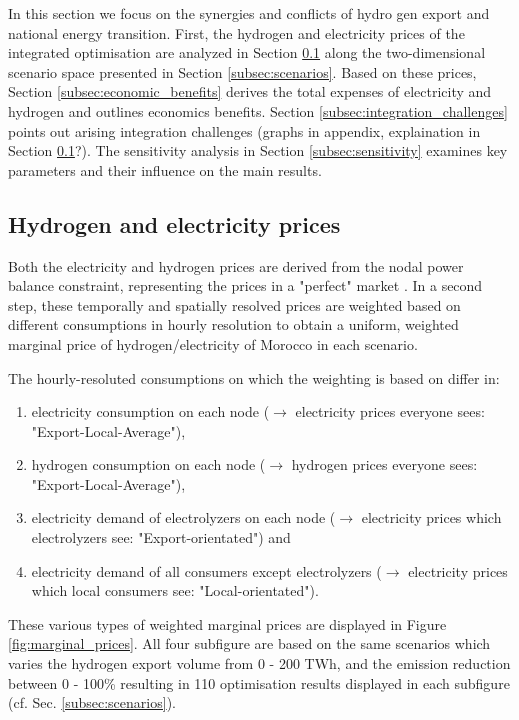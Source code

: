 In this section we focus on the synergies and conflicts of hydro gen export and national energy transition. First, the
hydrogen and electricity prices of the integrated optimisation are analyzed in Section \ref{subsec:results_prices} along the two-dimensional scenario space presented in Section \ref{subsec:scenarios}. Based on these prices, Section \ref{subsec:economic_benefits} derives the total expenses of electricity and hydrogen and outlines economics benefits. Section \ref{subsec:integration_challenges} points out arising integration challenges (graphs in appendix, explaination in Section \ref{subsec:results_prices}?). The sensitivity analysis in Section \ref{subsec:sensitivity} examines key parameters and their influence on the main results.


\subsection{Hydrogen and electricity prices}
\label{subsec:results_prices}

Both the electricity and hydrogen prices are derived from the nodal power balance constraint, representing the prices in a "perfect" market \cite{Zeyen2022}.
In a second step, these temporally and spatially resolved prices are weighted based on different consumptions in hourly resolution to obtain a uniform, weighted marginal price of hydrogen/electricity of Morocco in each scenario.

The hourly-resoluted consumptions on which the weighting is based on differ in:
\begin{enumerate}
    \item electricity consumption on each node ($\rightarrow$ electricity prices everyone sees: "Export-Local-Average"),
    \item hydrogen consumption on each node ($\rightarrow$ hydrogen prices everyone sees: "Export-Local-Average"),
    \item electricity demand of electrolyzers on each node ($\rightarrow$ electricity prices which electrolyzers see: "Export-orientated") and
    \item electricity demand of all consumers except electrolyzers ($\rightarrow$ electricity prices which local consumers see: "Local-orientated").
\end{enumerate}

These various types of weighted marginal prices are displayed in Figure \ref{fig:marginal_prices}. All four subfigure are based on the same scenarios which varies the hydrogen export volume from 0 - 200 TWh, and the emission reduction between 0 - 100\% resulting in 110 optimisation results displayed in each subfigure (cf. Sec. \ref{subsec:scenarios}).

